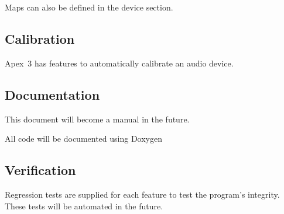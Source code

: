 \documentclass[a4paper,12pt]{article}
\begin{document}
Maps can also be defined in the device section.

\subsection{Calibration}

Apex~3 has features to automatically calibrate an audio device.

\subsection{Documentation}

This document will become a manual in the future.

All code will be documented using Doxygen

\subsection{Verification}

Regression tests are supplied for each feature to test the program's integrity. These tests will be automated in the future.

 

\end{document}
